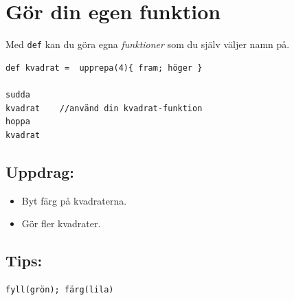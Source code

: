 \chapter{Gör din egen funktion}Med \lstinline{def} kan du göra egna {\it funktioner} som du själv väljer namn på.

\begin{lstlisting}[basicstyle={\ttfamily\fontsize{20}{24}\selectfont},numbers=none]
def kvadrat =  upprepa(4){ fram; höger }  

sudda
kvadrat    //använd din kvadrat-funktion
hoppa
kvadrat
\end{lstlisting}
        
\section*{\color{BrickRed}Uppdrag:}


\begin{itemize}

\item {Byt färg på kvadraterna.}
\item {Gör fler kvadrater.}

\end{itemize}


\section*{\color{OliveGreen}Tips:}

\begin{lstlisting}[numbers=none]
fyll(grön); färg(lila)
\end{lstlisting}
        
